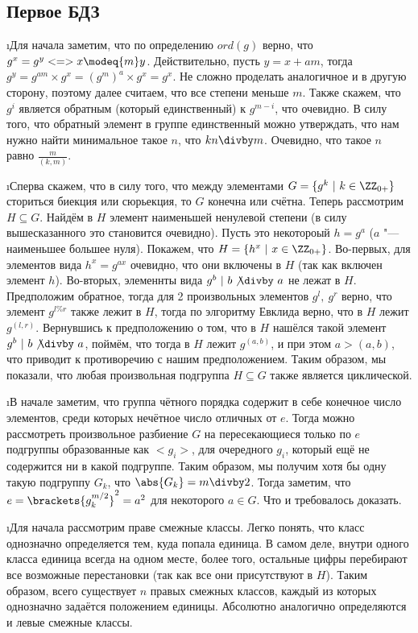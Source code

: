 \subsection{Первое БДЗ}

\i Для начала заметим, что по определению $ord(g)$ верно, что $g^{x} = g^{y} <=> x \modeq{m} y$. Действительно, пусть $y = x + am$, тогда $g^{y} = g^{am} \times g^{x} = (g^m)^a \times g^x = g^x$. Не сложно проделать аналогичное и в другую сторону, поэтому далее считаем, что все степени меньше $m$. Также скажем, что $g^{i}$ является обратным (который единственный) к $g^{m-i}$, что очевидно. В силу того, что обратный элемент в группе единственный можно утверждать, что нам нужно найти минимальное такое $n$, что $kn \divby m$. Очевидно, что такое $n$ равно $\frac{m}{(k, m)}$.

\i Сперва скажем, что в силу того, что между элементами $G = \{g^k \ |\ k \in \ZZ_{0+}\}$ сториться биекция или сюрьекция, то $G$ конечна или счётна. Теперь рассмотрим $H \subseteq G$. Найдём в $H$ элемент наименьшей ненулевой степени (в силу вышесказанного это становится очевидно). Пусть это некотороый $h = g^{a}$ ($a$ "--- наименьшее большее нуля). Покажем, что $H = \{h^{x} \ |\ x \in \ZZ_{0+}\}$. Во-первых, для элементов вида $h^x = g^{ax}$ очевидно, что они включены в $H$ (так как включен элемент $h$). Во-вторых, элеменнты вида $g^b \ |\ b \not\divby\ a$ не лежат в $H$. Предположим обратное, тогда для 2 произвольных элементов $g^{l},\ g^{r}$ верно, что элемент $g^{l\%r}$ также лежит в $H$, тогда по элгоритму Евклида верно, что в $H$ лежит $g^{(l, r)}$. Вернувшись к предположению о том, что в $H$ нашёлся такой элемент $g^b \ |\ b \not\divby\ a$, поймём, что тогда в $H$ лежит $g^{(a, b)}$, и при этом $a > (a, b)$, что приводит к противоречию с нашим предположением. Таким образом, мы показали, что любая произвольная подгруппа $H \subseteq G$ также является циклической.

\i В начале заметим, что группа чётного порядка содержит в себе конечное число элементов, среди которых нечётное число отличных от $e$. Тогда можно рассмотреть произвольное разбиение $G$ на пересекающиеся только по $e$ подгруппы образованные как $<$$g_i$$>$, для очередного $g_i$, который ещё не содержится ни в какой подгруппе. Таким образом, мы получим хотя бы одну такую подгруппу $G_k$, что $\abs{G_k} = m \divby 2$. Тогда заметим, что $e = \brackets{g_k^{m/2}}^2 = a^2$ для некоторого $a \in G$. Что и требовалось доказать.

\i Для начала рассмотрим праве смежные классы. Легко понять, что класс однозначно определяется тем, куда попала единица. В самом деле, внутри одного класса единица всегда на одном месте, более того, остальные цифры перебирают все возможные перестановки (так как все они присутствуют в $H$). Таким образом, всего существует $n$ правых смежных классов, каждый из которых однозначно задаётся положением единицы. Абсолютно аналогично определяются и левые смежные классы.